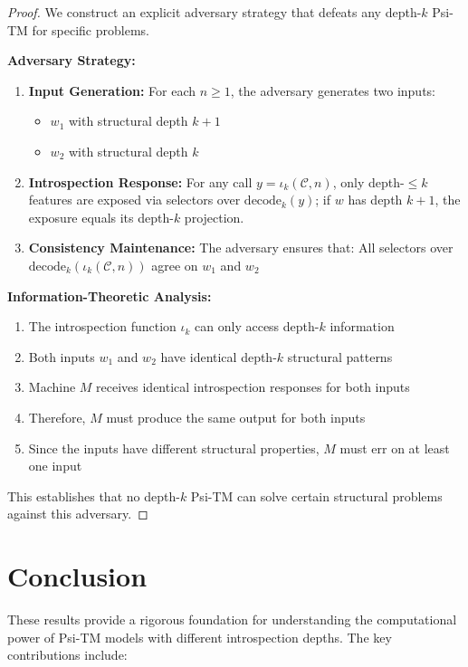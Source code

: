 \begin{proof}
We construct an explicit adversary strategy that defeats any depth-$k$ Psi-TM for specific problems.

\textbf{Adversary Strategy:}
\begin{enumerate}
\item \textbf{Input Generation:} For each $n \geq 1$, the adversary generates two inputs:
  \begin{itemize}
  \item $w_1$ with structural depth $k+1$
  \item $w_2$ with structural depth $k$
  \end{itemize}

\item \textbf{Introspection Response:} For any call $y=\iota_k(\mathcal{C},n)$, only depth-$\le k$ features are exposed via selectors over $\mathrm{decode}_k(y)$; if $w$ has depth $k{+}1$, the exposure equals its depth-$k$ projection.

\item \textbf{Consistency Maintenance:} The adversary ensures that:
All selectors over $\mathrm{decode}_k(\iota_k(\mathcal{C},n))$ agree on $w_1$ and $w_2$
\end{enumerate}

\textbf{Information-Theoretic Analysis:}
\begin{enumerate}
\item The introspection function $\iota_k$ can only access depth-$k$ information
\item Both inputs $w_1$ and $w_2$ have identical depth-$k$ structural patterns
\item Machine $M$ receives identical introspection responses for both inputs
\item Therefore, $M$ must produce the same output for both inputs
\item Since the inputs have different structural properties, $M$ must err on at least one input
\end{enumerate}

This establishes that no depth-$k$ Psi-TM can solve certain structural problems against this adversary.
\end{proof}

\section{Conclusion}

These results provide a rigorous foundation for understanding the computational power of Psi-TM models with different introspection depths. The key contributions include:

